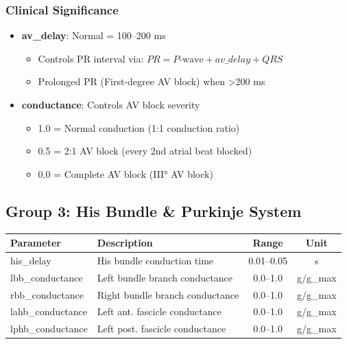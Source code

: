 \documentclass[11pt, a4paper]{article}
\begin{document}
\subsubsection{Clinical Significance}
\begin{itemize}
    \item \textbf{av\_delay}: Normal = 100--200 ms
        \begin{itemize}
            \item Controls PR interval via: $PR = P\text{-wave} + av\_delay + QRS$
            \item Prolonged PR (First-degree AV block) when >200 ms
        \end{itemize}
    \item \textbf{conductance}: Controls AV block severity
        \begin{itemize}
            \item 1.0 = Normal conduction (1:1 conduction ratio)
            \item 0.5 = 2:1 AV block (every 2nd atrial beat blocked)
            \item 0.0 = Complete AV block (III° AV block)
        \end{itemize}
\end{itemize}

\subsection{Group 3: His Bundle \& Purkinje System}

\begin{tabularx}{\textwidth}{|l|X|c|c|}
\hline
\textbf{Parameter} & \textbf{Description} & \textbf{Range} & \textbf{Unit} \\
\hline
his\_delay & His bundle conduction time & 0.01--0.05 & s \\
lbb\_conductance & Left bundle branch conductance & 0.0--1.0 & g/g\_max \\
rbb\_conductance & Right bundle branch conductance & 0.0--1.0 & g/g\_max \\
lahb\_conductance & Left ant. fascicle conductance & 0.0--1.0 & g/g\_max \\
lphb\_conductance & Left post. fascicle conductance & 0.0--1.0 & g/g\_max \\
\hline
\end{tabularx}
\end{document}
